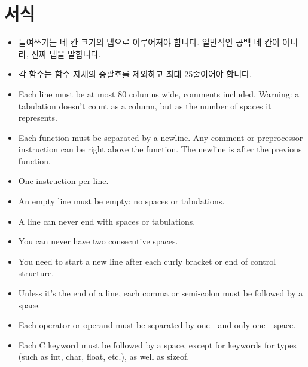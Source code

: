 \documentclass{42-ko}
\begin{document}
    \section{서식}

            \begin{itemize}

                \item 들여쓰기는 네 칸 크기의 탭으로 이루어져야 합니다.
                    일반적인 공백 네 칸이 아니라, 진짜 탭을 말합니다.

                \item 각 함수는 함수 자체의 중괄호를 제외하고 
                    최대 25줄이어야 합니다.

                \item Each line must be at most 80 columns wide, comments
                  included. Warning: a tabulation doesn't count
                  as a column, but as the number of spaces it
                  represents.

                \item Each function must be separated by a newline. Any comment or preprocessor instruction
                    can be right above the function. The newline is after the previous function.

                \item One instruction per line.

                \item An empty line must be empty: no spaces or tabulations.

                \item A line can never end with spaces or tabulations.

                \item You can never have two consecutive spaces.

                \item You need to start a new line after each curly bracket
                  or end of control structure.

                \item Unless it's the end of a line, each comma or semi-colon
                  must be followed by a space.

                \item Each operator or operand must be separated by one
                 - and only one - space.

                \item Each C keyword must be followed by a space, except for
                  keywords for types (such as int, char, float, etc.),
                  as well as sizeof.


\end{itemize}
\end{document}
